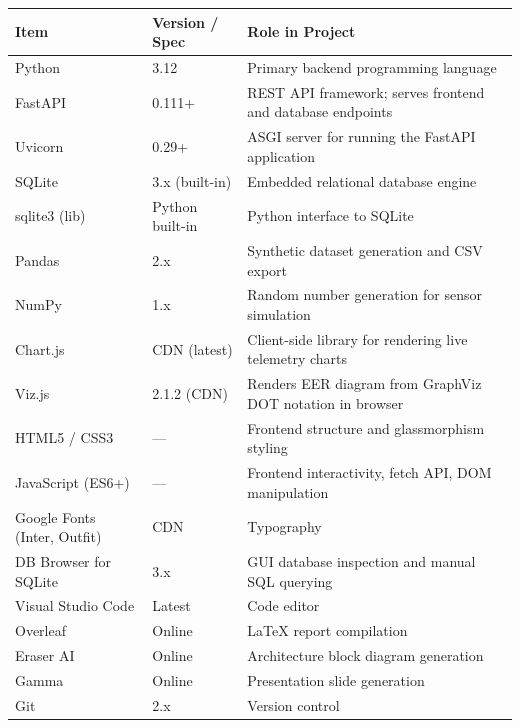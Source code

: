 \documentclass[12pt, a4paper]{report}
\begin{document}
\begin{longtable}{@{} p{4cm} p{4cm} p{6cm} @{}}
    \toprule
    \textbf{Item} & \textbf{Version / Spec} & \textbf{Role in Project} \\
    \midrule
    \endhead
    Python         & 3.12               & Primary backend programming language \\
    FastAPI        & 0.111+             & REST API framework; serves frontend and database endpoints \\
    Uvicorn        & 0.29+              & ASGI server for running the FastAPI application \\
    SQLite         & 3.x (built-in)     & Embedded relational database engine \\
    sqlite3 (lib)  & Python built-in    & Python interface to SQLite \\
    Pandas         & 2.x               & Synthetic dataset generation and CSV export \\
    NumPy          & 1.x               & Random number generation for sensor simulation \\
    Chart.js       & CDN (latest)       & Client-side library for rendering live telemetry charts \\
    Viz.js         & 2.1.2 (CDN)        & Renders EER diagram from GraphViz DOT notation in browser \\
    HTML5 / CSS3   & —                  & Frontend structure and glassmorphism styling \\
    JavaScript (ES6+) & —             & Frontend interactivity, fetch API, DOM manipulation \\
    Google Fonts (Inter, Outfit) & CDN & Typography \\
    DB Browser for SQLite & 3.x       & GUI database inspection and manual SQL querying \\
    Visual Studio Code & Latest        & Code editor \\
    Overleaf       & Online            & LaTeX report compilation \\
    Eraser AI      & Online            & Architecture block diagram generation \\
    Gamma          & Online            & Presentation slide generation \\
    Git            & 2.x               & Version control \\
    \bottomrule
\end{longtable}

\newpage
\end{document}
